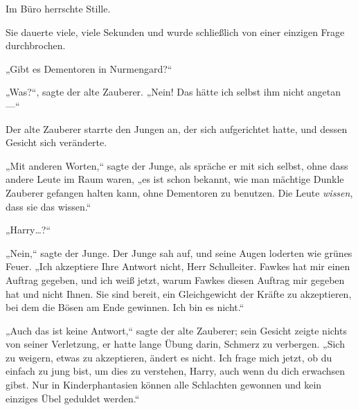 Im Büro herrschte Stille.

Sie dauerte viele, viele Sekunden und wurde schließlich von einer einzigen Frage durchbrochen.

„Gibt es Dementoren in Nurmengard?“

„Was?“, sagte der alte Zauberer. „Nein! Das hätte ich selbst ihm nicht angetan—“

\later

Der alte Zauberer starrte den Jungen an, der sich aufgerichtet hatte, und dessen Gesicht sich veränderte.

„Mit anderen Worten,“ sagte der Junge, als spräche er mit sich selbst, ohne dass andere Leute im Raum waren, „es ist schon bekannt, wie man mächtige Dunkle Zauberer gefangen halten kann, ohne Dementoren zu benutzen. Die Leute \emph{wissen}, dass sie das wissen.“

„Harry…?“

„Nein,“ sagte der Junge. Der Junge sah auf, und seine Augen loderten wie grünes Feuer. „Ich akzeptiere Ihre Antwort nicht, Herr Schulleiter. Fawkes hat mir einen Auftrag gegeben, und ich weiß jetzt, warum Fawkes diesen Auftrag mir gegeben hat und nicht Ihnen. Sie sind bereit, ein Gleichgewicht der Kräfte zu akzeptieren, bei dem die Bösen am Ende gewinnen. Ich bin es nicht.“

„Auch das ist keine Antwort,“ sagte der alte Zauberer; sein Gesicht zeigte nichts von seiner Verletzung, er hatte lange Übung darin, Schmerz zu verbergen. „Sich zu weigern, etwas zu akzeptieren, ändert es nicht. Ich frage mich jetzt, ob du einfach zu jung bist, um dies zu verstehen, Harry, auch wenn du dich erwachsen gibst. Nur in Kinderphantasien können alle Schlachten gewonnen und kein einziges Übel geduldet werden.“

